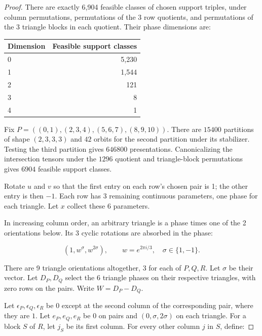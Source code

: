 \documentclass[11pt,a4paper]{article}
\theoremstyle{plain}
\theoremstyle{definition}
\theoremstyle{plain}
\begin{document}
\begin{proof}
There are exactly 6,904 feasible classes of chosen support triples, under column permutations, permutations of the 3 row quotients, and permutations of the 3 triangle blocks in each quotient. Their phase dimensions are:

\begin{center}
\begin{tabular}{@{}lr@{}}
\toprule
Dimension & Feasible support classes \\
\midrule


0 & 5,230 \\
1 & 1,544 \\
2 & 121 \\
3 & 8 \\
4 & 1 \\
\end{tabular}
\end{center}

\medskip

Fix $P=((0,1),(2,3,4),(5,6,7),(8,9,10))$. There are $15400$ partitions of shape $(2,3,3,3)$ and $42$ orbits for the second partition under its stabilizer. Testing the third partition gives $646800$ presentations. Canonicalizing the intersection tensors under the $1296$ quotient and triangle-block permutations gives $6904$ feasible support classes.

\medskip
Rotate $u$ and $v$ so that the first entry on each row's chosen pair is 1; the other entry is then $-1$. Each row has 3 remaining continuous parameters, one phase for each triangle. Let $x$ collect these 6 parameters.

In increasing column order, an arbitrary triangle is a phase times one of the 2 orientations below. Its 3 cyclic rotations are absorbed in the phase:

$$(1,w^{\sigma},w^{2\sigma}),\qquad w=e^{2\pi i/3},\quad \sigma\in\{1,-1\}.$$

There are 9 triangle orientations altogether, 3 for each of $P,Q,R$. Let $\sigma$ be their vector. Let $D_P,D_Q$ select the 6 triangle phases on their respective triangles, with zero rows on the pairs. Write $W = D_P - D_Q$.

Let $\epsilon_P,\epsilon_Q,\epsilon_R$ be $0$ except at the second column of the corresponding pair, where they are $1$. Let $e_P,e_Q,e_R$ be $0$ on pairs and $(0,\sigma,2\sigma)$ on each triangle. For a block $S$ of $R$, let $j_S$ be its first column. For every other column $j$ in $S$, define:


\end{proof}
\end{document}
